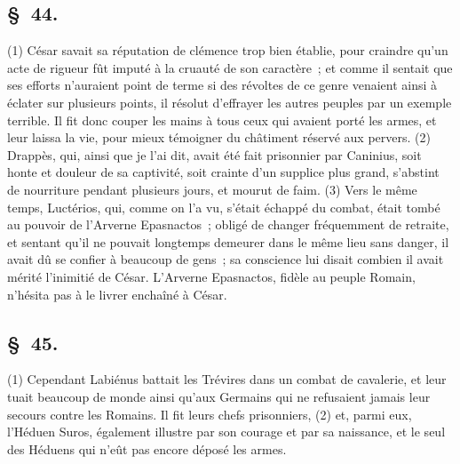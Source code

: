 \documentclass[french,twoside]{book} %
\begin{document}
\subsection[{§ 44.}]{ \textsc{§ 44.} }
\noindent (1) César savait sa réputation de clémence trop bien établie, pour craindre qu’un acte de rigueur fût imputé à la cruauté de son caractère ; et comme il sentait que ses efforts n’auraient point de terme si des révoltes de ce genre venaient ainsi à éclater sur plusieurs points, il résolut d’effrayer les autres peuples par un exemple terrible. Il fit donc couper les mains à tous ceux qui avaient porté les armes, et leur laissa la vie, pour mieux témoigner du châtiment réservé aux pervers. (2) Drappès, qui, ainsi que je l’ai dit, avait été fait prisonnier par Caninius, soit honte et douleur de sa captivité, soit crainte d’un supplice plus grand, s’abstint de nourriture pendant plusieurs jours, et mourut de faim. (3) Vers le même temps, Luctérios, qui, comme on l’a vu, s’était échappé du combat, était tombé au pouvoir de l’Arverne Epasnactos ; obligé de changer fréquemment de retraite, et sentant qu’il ne pouvait longtemps demeurer dans le même lieu sans danger, il avait dû se confier à beaucoup de gens ; sa conscience lui disait combien il avait mérité l’inimitié de César. L'Arverne Epasnactos, fidèle au peuple Romain, n’hésita pas à le livrer enchaîné à César.
\subsection[{§ 45.}]{ \textsc{§ 45.} }
\noindent (1) Cependant Labiénus battait les Trévires dans un combat de cavalerie, et leur tuait beaucoup de monde ainsi qu’aux Germains qui ne refusaient jamais leur secours contre les Romains. Il fit leurs chefs prisonniers, (2) et, parmi eux, l’Héduen Suros, également illustre par son courage et par sa naissance, et le seul des Héduens qui n’eût pas encore déposé les armes.
\end{document}
